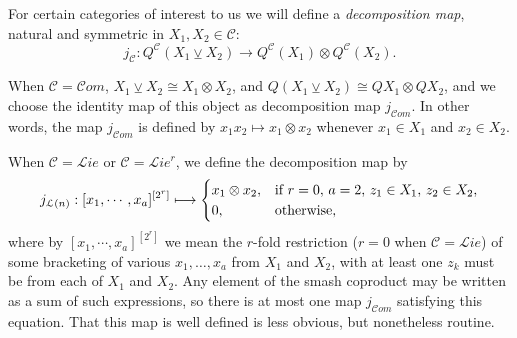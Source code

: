 \documentclass[11pt]{amsart} \renewcommand{\baselinestretch}{1.4}
\theoremstyle{plain}
\theoremstyle{definition}
\renewcommand{\to}{\longrightarrow}
\newcommand{\scrL}{\mathscr{L}}
\newcommand{\scrC}{\mathscr{C}}
\newcommand{\calL}{\mathcal{L}}
\newcommand{\calc}{\mathcal{C}}
\newcommand{\restnRepeated}[2]{#1^{[2^{#2}]}}
\newcommand{\crossterms}{\mathrm{cr}}
\newcommand{\algs}{{\scrC\!\textit{om}}}
\newcommand{\liealgs}{{\scrL\!\textit{ie}}}
\newcommand{\restliealgs}{{\scrL\!\textit{ie}^\textit{r}}}
\newcommand{\smashcoprod}{\veebar}%
\renewcommand{\mapsto}{\longmapsto}
\begin{document}
\begin{Pi-algebras and cohomology algebras}
%

For certain categories of interest to us we will define a \emph{decomposition map}, natural and symmetric in $X_1,X_2\in\calc$:
\[j_\calc:Q^\calc(X_1\smashcoprod X_2)\to Q^\calc(X_1)\otimes Q^\calc(X_2).\]

When $\calc=\algs$, $X_1\smashcoprod X_2\cong X_1\otimes X_2$, and $Q(X_1\smashcoprod X_2)\cong QX_1\otimes QX_2$, and we choose the identity map of this object as decomposition map $j_\algs$. In other words, the map $j_{\algs}$ is defined by $x_1x_2\mapsto x_1\otimes x_2$ whenever $x_1\in X_1$ and $x_2\in X_2$.

When $\calc=\liealgs$ or $\calc=\restliealgs$, we define the decomposition map by 
\[j_{\calL(n)}:\restnRepeated{[x_1,\cdots ,x_a]}{r}\longmapsto\begin{cases}
x_1\otimes x_2,&\textup{if }r=0,\,a=2,\,z_1\in X_1,\,z_2\in X_2,
\\0,&\textup{otherwise,}
\end{cases}\]
where by $\restnRepeated{[x_1,\cdots ,x_a]}{r}$ we mean the $r$-fold restriction ($r=0$ when $\calc=\liealgs$) of some bracketing of various $x_1,\ldots,x_a$ from $X_1$ and $X_2$, with at least one $z_k$ must be from each of $X_1$ and $X_2$.  Any element of the smash coproduct may be written as a sum of such expressions, so there is at most one map $j_\algs$ satisfying this equation. That this map is well defined is less obvious, but nonetheless routine.



\end{Pi-algebras and cohomology algebras}
\end{document}
